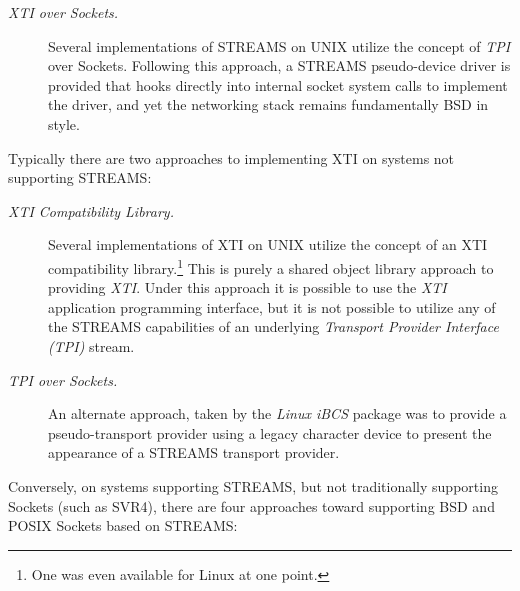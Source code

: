 \documentclass[letterpaper,final,notitlepage,twocolumn,10pt,twoside]{article}
\begin{document}
\begin{description}

\item[{\it XTI over Sockets.}]

Several implementations of STREAMS on UNIX utilize the concept of \textsl{TPI}
over Sockets.  Following this approach, a STREAMS pseudo-device driver is
provided that hooks directly into internal socket system calls to implement
the driver, and yet the networking stack remains fundamentally BSD in style.

\end{description}

Typically there are two approaches to implementing XTI on systems not
supporting STREAMS:

\begin{description}

\item[{\it XTI Compatibility Library.}]

Several implementations of XTI on UNIX utilize the concept of an XTI
compatibility library.\footnote{One was even available for Linux at one
point.}  This is purely a shared object library approach to providing
\textsl{XTI}.  Under this approach it is possible to use the \textsl{XTI}
application programming interface, but it is not possible to utilize any of
the STREAMS capabilities of an underlying \textit{Transport Provider Interface
(TPI)} stream.

\item[{\it TPI over Sockets.}]

An alternate approach, taken by the \textsl{Linux iBCS} package was to provide
a pseudo-transport provider using a legacy character device to present the
appearance of a STREAMS transport provider.

\end{description}

Conversely, on systems supporting STREAMS, but not traditionally supporting
Sockets (such as SVR4), there are four approaches toward supporting BSD and
POSIX Sockets based on STREAMS:
\end{document}
